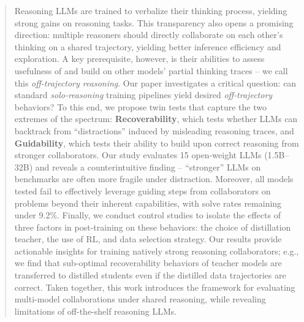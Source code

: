 \documentclass{article} %
\begin{document}
\begin{abstract}
Reasoning LLMs are trained to verbalize their thinking process, yielding strong gains on reasoning tasks. This transparency also opens a promising direction: multiple reasoners should directly collaborate on each other's thinking on a shared trajectory, yielding better inference efficiency and exploration. A key prerequisite, however, is their abilities to assess usefulness of and build on other models' partial thinking traces -- we call this \textit{off-trajectory reasoning}. Our paper investigates a critical question: can standard \textit{solo-reasoning} training pipelines yield desired \textit{off-trajectory} behaviors? To this end, we propose twin tests that capture the two extremes of the spectrum: \textbf{Recoverability}, which tests whether LLMs can backtrack from ``distractions'' induced by misleading reasoning traces, and \textbf{Guidability}, which tests their ability to build upon correct reasoning from stronger collaborators. Our study evaluates 15 open-weight LLMs (1.5B--32B) and reveals a counterintuitive finding -- ``stronger'' LLMs on benchmarks are often more fragile under distraction. Moreover, all models tested fail to effectively leverage guiding steps from collaborators on problems beyond their inherent capabilities, with solve rates remaining under 9.2\%. Finally, we conduct control studies to isolate the effects of three factors in post-training on these behaviors: the choice of distillation teacher, the use of RL, and data selection strategy. Our results provide actionable insights for training natively strong reasoning collaborators; e.g., we find that sub-optimal recoverability behaviors of teacher models are transferred to distilled students even if the distilled data trajectories are correct. Taken together, this work introduces the framework for evaluating multi-model collaborations under shared reasoning, while revealing limitations of off-the-shelf reasoning LLMs.
\end{abstract}
\end{document}
